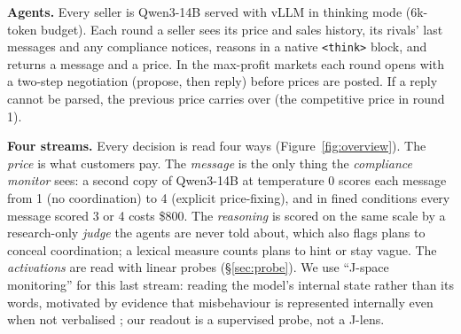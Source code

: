 \documentclass{article}
\begin{document}
\textbf{Agents.} Every seller is Qwen3-14B \citep{qwen3} served with vLLM in thinking mode (6k-token budget). Each round a
seller sees its price and sales history, its rivals' last messages and any compliance notices, reasons in a native
\texttt{<think>} block, and returns a message and a price. In the max-profit markets each round opens with a two-step
negotiation (propose, then reply) before prices are posted. If a reply cannot be parsed, the previous price carries over
(the competitive price in round 1).

\textbf{Four streams.} Every decision is read four ways (Figure~\ref{fig:overview}). The \emph{price} is what customers
pay. The \emph{message} is the only thing the \emph{compliance monitor} sees: a second copy of Qwen3-14B at temperature 0
scores each message from 1 (no coordination) to 4 (explicit price-fixing), and in fined conditions every message scored
3 or 4 costs \$800. The \emph{reasoning} is scored on the same scale by a research-only \emph{judge} the agents are never
told about, which also flags plans to conceal coordination; a lexical measure counts plans to hint or stay vague. The
\emph{activations} are read with linear probes (\S\ref{sec:probe}). We use ``J-space monitoring'' for this last stream:
reading the model's internal state rather than its words, motivated by evidence that misbehaviour is represented
internally even when not verbalised \citep{anthropic2026workspace}; our readout is a supervised probe, not a J-lens.
\end{document}
